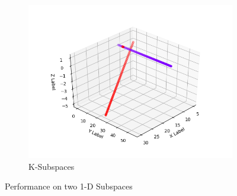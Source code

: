 \documentclass[12pt]{article}
\begin{document}
\begin{enumerate}
\begin{figure}
    \begin{subfigure}[b]{0.3\textwidth}
        \includegraphics[width=\textwidth]{ksubfigures/2linesksub.png}
        \caption{K-Subspaces}
        \label{fig:ksub}
    \end{subfigure}
    \caption{Performance on two 1-D Subspaces}\label{fig:2lineswhole}
\end{figure}





\end{enumerate}
\end{document}
